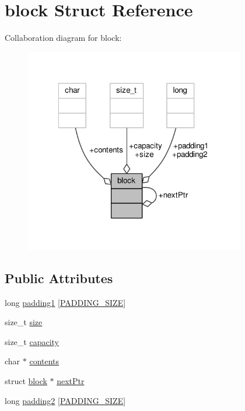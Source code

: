 \hypertarget{structblock}{\section{block Struct Reference}
\label{structblock}
}


Collaboration diagram for block\-:
\nopagebreak
\begin{figure}[H]
\begin{center}
\leavevmode
\includegraphics[width=273pt]{structblock__coll__graph}
\end{center}
\end{figure}
\subsection*{Public Attributes}
\begin{DoxyCompactItemize}
\item 
long \hyperlink{structblock_a476d5af9cbb3b23da97771d09ab6fbf8}{padding1} \mbox{[}\hyperlink{memory_8c_a94f6012543c347973177b45c908cd024}{P\-A\-D\-D\-I\-N\-G\-\_\-\-S\-I\-Z\-E}\mbox{]}
\item 
size\-\_\-t \hyperlink{structblock_a40c8e08013eb90aa6db19e1cbc7f3186}{size}
\item 
size\-\_\-t \hyperlink{structblock_aa877f807e4279d9d47401d1d4f0de680}{capacity}
\item 
char $\ast$ \hyperlink{structblock_a4ddc2427f5e4c0f9d95249b31f8cb524}{contents}
\item 
struct \hyperlink{structblock}{block} $\ast$ \hyperlink{structblock_a1fe1396cf5e0f6ef16c967c9c1537314}{next\-Ptr}
\item 
long \hyperlink{structblock_a5f97eac1d1f3a8a4d5e05f38e5038956}{padding2} \mbox{[}\hyperlink{memory_8c_a94f6012543c347973177b45c908cd024}{P\-A\-D\-D\-I\-N\-G\-\_\-\-S\-I\-Z\-E}\mbox{]}
\end{DoxyCompactItemize}


